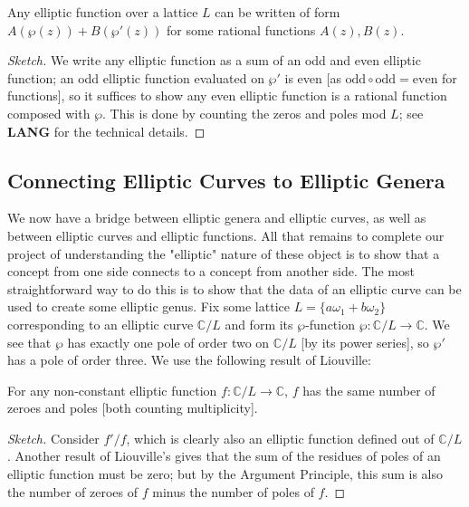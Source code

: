 \begin{theorem}
    Any elliptic function over a lattice $L$ can be written of form $A(\wp(z)) + B( \wp '(z))$ for some rational functions $A(z), B(z)$. 
\end{theorem}

\begin{proof}[Sketch]
    We write any elliptic function as a sum of an odd and even elliptic function; an odd elliptic function evaluated on $\wp'$ is even [as $\text{odd} \circ \text{odd} = \text{even}$ for functions], so it suffices to show any even elliptic function is a rational function composed with $\wp$. This is done by counting the zeros and poles mod $L$; see \textbf{LANG} for the technical details.
\end{proof}

\subsection{Connecting Elliptic Curves to Elliptic Genera}

We now have a bridge between elliptic genera and elliptic curves, as well as between elliptic curves and elliptic functions. All that remains to complete our project of understanding the "elliptic" nature of these object is to show that a concept from one side connects to a concept from another side. The most straightforward way to do this is to show that the data of an elliptic curve can be used to create some elliptic genus. Fix some lattice $L = \{a \omega_1 + b \omega_2 \}$ corresponding to an elliptic curve $\mathbb{C} / L$ and form its $\wp$-function $\wp: \mathbb{C} / L \to \mathbb{C}$. We see that $\wp$ has exactly one pole of order two on $\mathbb{C} / L$ [by its power series], so $\wp'$ has a pole of order three. We use the following result of Liouville:

\begin{lemma}
    For any non-constant elliptic function $f: \mathbb{C} / L \to \mathbb{C}$, $f$ has the same number of zeroes and poles [both counting multiplicity].
\end{lemma}

\begin{proof}[Sketch]
    Consider $f' / f$, which is clearly also an elliptic function defined out of $\mathbb{C}/L$. Another result of Liouville's gives that the sum of the residues of poles of an elliptic function must be zero; but by the Argument Principle, this sum is also the number of zeroes of $f$ minus the number of poles of $f$.
\end{proof}

